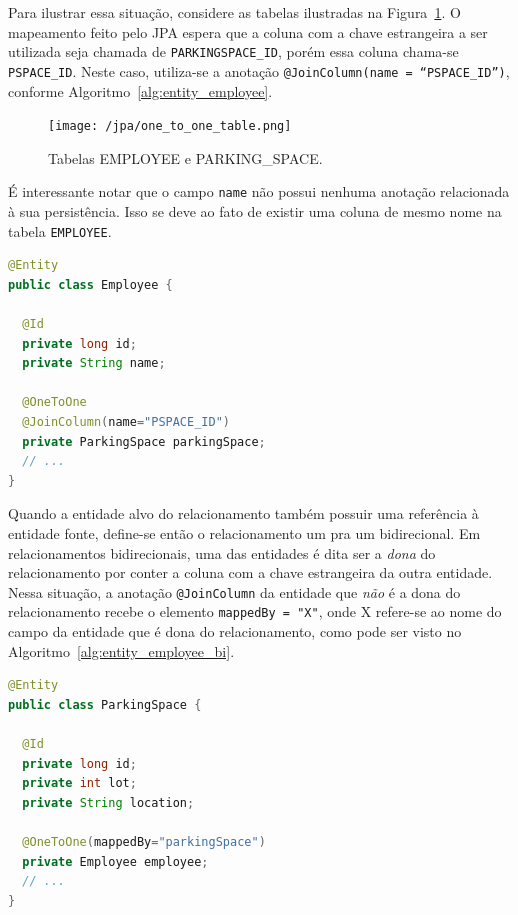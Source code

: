\documentclass[
  10.5pt,				  %
	openright,			%
	twoside,			  %
  a5paper,
  chapter=TITLE,	%
	section=TITLE,	%
  hyphens,        %
	english,        %
	brazil          %
]{abntex2}
\begin{document}
Para ilustrar essa situação, considere as tabelas ilustradas na Figura~\ref{fig:jpa_onetoone}. O mapeamento feito pelo JPA espera que a coluna com a chave estrangeira a ser utilizada seja chamada de \texttt{PARKINGSPACE\_ID}, porém essa coluna chama-se \texttt{PSPACE\_ID}. Neste caso, utiliza-se a anotação \texttt{@JoinColumn(name = ``PSPACE\_ID'')}, conforme Algoritmo~\ref{alg:entity_employee}.



\begin{figure}[!ht]
  \caption{\label{fig:jpa_onetoone} Tabelas EMPLOYEE e PARKING\_SPACE.}
  \begin{center}
    \texttt{[image: /jpa/one\_to\_one\_table.png]}
  \end{center}
\end{figure}

É interessante notar que o campo \texttt{name} não possui nenhuma anotação relacionada à sua persistência. Isso se deve ao fato de existir uma coluna de mesmo nome na tabela \texttt{EMPLOYEE}.

\begin{lstlisting}[language=java, caption={Classe Employee e seus relacionamentos.}, label={alg:entity_employee}]
@Entity
public class Employee {

  @Id
  private long id;
  private String name;
  
  @OneToOne
  @JoinColumn(name="PSPACE_ID")
  private ParkingSpace parkingSpace;
  // ...
}
\end{lstlisting}



Quando a entidade alvo do relacionamento também possuir uma referência à entidade fonte, define-se então o relacionamento um pra um bidirecional. Em relacionamentos bidirecionais, uma das entidades é dita ser a \emph{dona} do relacionamento por conter a coluna com a chave estrangeira da outra entidade. Nessa situação, a anotação \texttt{@JoinColumn} da entidade que \emph{não} é a dona do relacionamento recebe o elemento \texttt{mappedBy = "X"}, onde X refere-se ao nome do campo da entidade que é dona do relacionamento, como pode ser visto no Algoritmo~\ref{alg:entity_employee_bi}.

\begin{lstlisting}[language=java, caption={Classe Employee e seus relacionamentos.}, label={alg:entity_employee_bi}]
@Entity
public class ParkingSpace {
  
  @Id
  private long id;
  private int lot;
  private String location;

  @OneToOne(mappedBy="parkingSpace")
  private Employee employee;
  // ...
}
\end{lstlisting}
\end{document}
